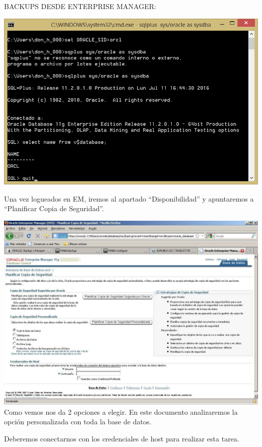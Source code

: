 \documentclass[a4paper,openright,12pt]{book}
\begin{document}
BACKUPS  DESDE  ENTERPRISE  MANAGER:
\begin{center}
\includegraphics[width=15cm]{./images/backup/1.png}
\end{center}
Una  vez  logueados  en  EM,  iremos  al  apartado  “Disponibilidad”  y  apuntaremos  a
“Planificar Copia de Seguridad”.
\begin{center}
\includegraphics[width=15cm]{./images/backup/2.jpg}
Como vemos nos da 2 opciones a elegir. En este documento analizaremos la opción personalizada con toda la base de datos.
\end{center}
Deberemos conectarnos con los credenciales de host para realizar esta tarea.
\end{document}
